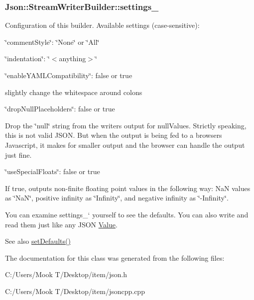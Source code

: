 \subsubsection[{settings\+\_\+}]{ Json\+::\+Stream\+Writer\+Builder\+::settings\+\_\+}\label{class_json_1_1_stream_writer_builder_a79bdf2e639a52f4e758c0b95bd1d3423}
Configuration of this builder. Available settings (case-\/sensitive)\+:
\begin{DoxyItemize}
\item \char`\"{}comment\+Style\char`\"{}\+: \char`\"{}\+None\char`\"{} or \char`\"{}\+All\char`\"{}
\item \char`\"{}indentation\char`\"{}\+: \char`\"{}$<$anything$>$\char`\"{}
\item \char`\"{}enable\+Y\+A\+M\+L\+Compatibility\char`\"{}\+: false or true
\begin{DoxyItemize}
\item slightly change the whitespace around colons
\end{DoxyItemize}
\item \char`\"{}drop\+Null\+Placeholders\char`\"{}\+: false or true
\begin{DoxyItemize}
\item Drop the \char`\"{}null\char`\"{} string from the writer\textquotesingle{}s output for null\+Values. Strictly speaking, this is not valid J\+S\+O\+N. But when the output is being fed to a browser\textquotesingle{}s Javascript, it makes for smaller output and the browser can handle the output just fine.
\end{DoxyItemize}
\item \char`\"{}use\+Special\+Floats\char`\"{}\+: false or true
\begin{DoxyItemize}
\item If true, outputs non-\/finite floating point values in the following way\+: Na\+N values as \char`\"{}\+Na\+N\char`\"{}, positive infinity as \char`\"{}\+Infinity\char`\"{}, and negative infinity as \char`\"{}-\/\+Infinity\char`\"{}.
\end{DoxyItemize}
\end{DoxyItemize}

You can examine \textquotesingle{}settings\+\_\+` yourself to see the defaults. You can also write and read them just like any J\+S\+O\+N \hyperlink{class_json_1_1_value}{Value}. \begin{DoxySeeAlso}{See also}
\hyperlink{class_json_1_1_stream_writer_builder_a53bf106b141e28637b01ad0ecd2acbf6}{set\+Defaults()} 
\end{DoxySeeAlso}


The documentation for this class was generated from the following files\+:\begin{DoxyCompactItemize}
\item 
C\+:/\+Users/\+Mook T/\+Desktop/item/json.\+h\item 
C\+:/\+Users/\+Mook T/\+Desktop/item/jsoncpp.\+cpp\end{DoxyCompactItemize}
